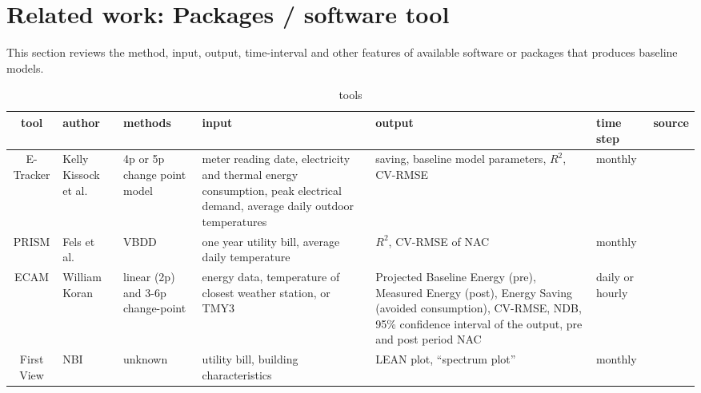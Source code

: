 \documentclass[12pt]{article}
\begin{document}
\section{Related work: Packages / software tool}
This section reviews the method, input, output, time-interval and
other features of available software or packages that produces
baseline models.
\begin{table}[h!]
  \centering
  \tiny
  \begin{tabular}{c|p{}|p{2cm}|p{4cm}|p{4cm}|p{1cm}|p{0.5cm}}
    \hline
    tool&author&methods&input&output&time step&source\\
    \hline
    \hline
    E-Tracker&Kelly Kissock et al.\ &4p or 5p change point model&meter reading date, electricity and thermal energy consumption, peak electrical demand, average daily outdoor temperatures&saving, baseline model parameters, $R^2$, CV-RMSE&monthly&~\cite{etracker2003}\\
    \hline
    PRISM&Fels et al.\ &VBDD&one year utility bill, average daily temperature&$R^2$, CV-RMSE of NAC&monthly&~\cite{fels1986prism}\\
    \hline
    ECAM&William Koran&linear (2p) and 3-6p change-point &energy data, temperature of closest weather station, or TMY3&Projected Baseline Energy (pre), Measured Energy (post), Energy Saving (avoided consumption), CV-RMSE, NDB, 95\% confidence interval of the output, pre and post period NAC&daily or hourly&~\cite{ecamPnnl2016}\\
    \hline
    First View&NBI&unknown&utility bill, building characteristics&LEAN plot, ``spectrum plot''&monthly&~\cite{firstViewUnder2016}\\
                \hline
  \end{tabular}
  \caption{tools}
  \label{tab:tool}
\end{table}
\FloatBarrier
\end{document}
